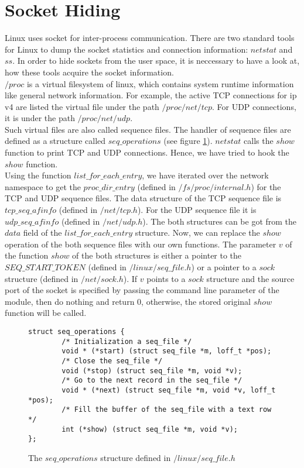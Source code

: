 \section{Socket Hiding}
Linux uses socket for inter-process communication. There are two standard tools for Linux to dump the socket statistics and connection information: $netstat$ and $ss$. In order to hide sockets from the user space, it is neccessary to have a look at, how these tools acquire the socket information. \\
$/proc$ is a virtual filesystem of linux, which contains system runtime information like general network information. For example, the active TCP connections for ip v4 are listed the virtual file under the path $/proc/net/tcp$. For UDP connections, it is under the path $/proc/net/udp$.\\
Such virtual files are also called sequence files. The handler of sequence files are defined as a structure called $seq\_operations$ (see figure \ref{ls:op}). $netstat$ calls the $show$ function to print TCP and UDP connections. Hence, we have tried to hook the $show$ function.\\
Using the function $list\_for\_each\_entry$, we have iterated over the network namespace to get the $proc\_dir\_entry$ (defined in $/fs/proc/internal.h$) for the TCP and UDP sequence files. The data structure of the TCP sequence file is $tcp\_seq\_afinfo$ (defined in $/net/tcp.h$). For the UDP sequence file it is $udp\_seq\_afinfo$ (defined in $/net/udp.h$). The both structures can be got from the $data$ field of the $list\_for\_each\_entry$ structure. Now, we can replace the $show$ operation of the both sequence files with our own functions. The parameter $v$ of the function $show$ of the both structures is either a pointer to the $SEQ\_START\_TOKEN$ (defined in $/linux/seq\_file.h$) or a pointer to a $sock$ structure (defined in $/net/sock.h$). If $v$ points to a $sock$ structure and the source port of the socket is specified by passing the command line parameter of the module, then do nothing and return 0, otherwise, the stored original $show$ function will be called.
\begin{center}
\begin{figure}
\lstset{escapechar=,style=customc}
\begin{lstlisting}
struct seq_operations {
		/* Initialization a seq_file */		
		void * (*start) (struct seq_file *m, loff_t *pos);
		/* Close the seq_file */
		void (*stop) (struct seq_file *m, void *v);
		/* Go to the next record in the seq_file */
		void * (*next) (struct seq_file *m, void *v, loff_t *pos);
		/* Fill the buffer of the seq_file with a text row */
		int (*show) (struct seq_file *m, void *v);
};
\end{lstlisting}
\caption{The $seq\_operations$ structure defined in $/linux/seq\_file.h$}
\label{ls:op}
\end{figure}
\end{center}
